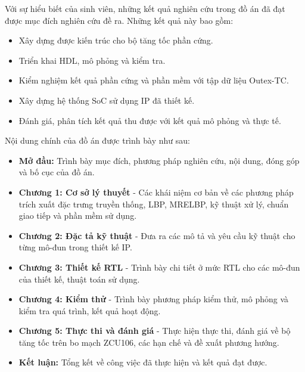 Với sự hiểu biết của sinh viên, những kết quả nghiên cứu trong đồ án đã đạt được mục đích nghiên cứu đề ra. Những kết quả này bao gồm:

\renewcommand{\labelitemi}{$-$}
\begin{itemize}
	\item Xây dựng được kiến trúc cho bộ tăng tốc phần cứng.
	\item Triển khai HDL, mô phỏng và kiểm tra.
	\item Kiểm nghiệm kết quả phần cứng và phần mềm với tập dữ liệu Outex-TC.
	\item Xây dựng hệ thống SoC sử dụng IP đã thiết kế.
	\item Đánh giá, phân tích kết quả thu được với kết quả mô phỏng và thực tế.
\end{itemize} 

\vspace{0.5cm}

Nội dung chính của đồ án được trình bày như sau:

\renewcommand{\labelitemi}{$-$}
\begin{itemize}
	\item \textbf{Mở đầu:} Trình bày mục đích, phương pháp nghiên cứu, nội dung, đóng góp và bố cục của đồ án.
	\item \textbf{Chương 1: Cơ sở lý thuyết} - Các khái niệm cơ bản về các phương pháp trích xuất đặc trưng truyền thống, LBP, MRELBP, kỹ thuật xử lý, chuẩn giao tiếp và phần mềm sử dụng.
    \item  \textbf{Chương 2: Đặc tả kỹ thuật} - Đưa ra các mô tả và yêu cầu kỹ thuật cho từng mô-đun trong thiết kế IP.
	\item  \textbf{Chương 3: Thiết kế RTL} - Trình bày chi tiết ở mức RTL cho các mô-đun của thiết kế, thuật toán sử dụng.
    
	\item\textbf{Chương 4: Kiểm thử} - Trình bày phương pháp kiểm thử, mô phỏng và kiểm tra quá trình, kết quả hoạt động.
	\item  \textbf{Chương 5: Thực thi và đánh giá} - Thực hiện thực thi, đánh giá về bộ tăng tốc trên bo mạch ZCU106, các hạn chế và đề xuất phương hướng. 
    \item \textbf{Kết luận: }Tổng kết về công việc đã thực hiện và kết quả đạt được.
\end{itemize} 